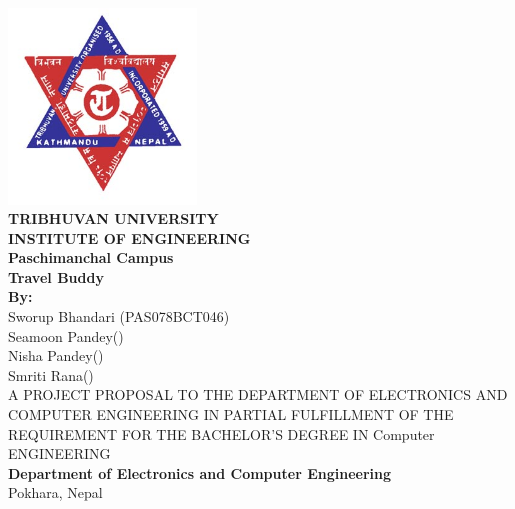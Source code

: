 \newenvironment{coverpage}
\thispagestyle{empty}
\begin{titlepage}
 
  \noindent%
  
  \begin{center}
  	\includegraphics[width=50mm]{figures/tu.jpg}\\
  
\textsc{\LARGE \bfseries TRIBHUVAN UNIVERSITY}\\[0.5cm] %
\textsc{\large \bfseries INSTITUTE OF ENGINEERING}\\
\large \textbf{ Paschimanchal Campus } \\[0.5cm]
\vspace{0.5cm}
\Large \textbf{Travel Buddy}\\[0.5cm]
\vspace{0.5cm}
\textbf{By:}\\
\large{ Sworup Bhandari   (PAS078BCT046) \\
Seamoon Pandey()\\
Nisha Pandey()\\
Smriti Rana()}\\
\vspace{1.2cm}
A PROJECT PROPOSAL TO THE DEPARTMENT OF ELECTRONICS AND COMPUTER
	ENGINEERING IN PARTIAL FULFILLMENT OF THE REQUIREMENT FOR THE BACHELOR'S
	DEGREE IN Computer ENGINEERING \\[1.2cm]


\textbf{Department of Electronics and Computer Engineering}\\
Pokhara, Nepal
\\[0.4cm]
\vspace{0.5cm}

\end{center}
\end{titlepage}
